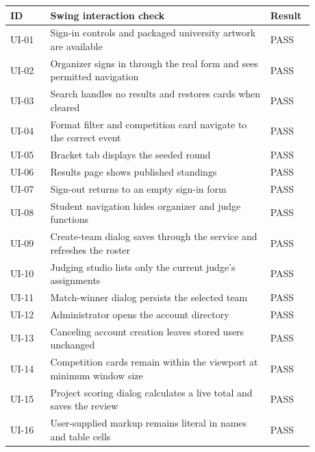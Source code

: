 \begingroup\renewcommand{\arraystretch}{1.05}\footnotesize\begin{longtable}{p{0.12\linewidth}p{0.66\linewidth}p{0.1\linewidth}}\toprule ID & Swing interaction check & Result\\\midrule\endhead
UI-01 & Sign-in controls and packaged university artwork are available & PASS\\
UI-02 & Organizer signs in through the real form and sees permitted navigation & PASS\\
UI-03 & Search handles no results and restores cards when cleared & PASS\\
UI-04 & Format filter and competition card navigate to the correct event & PASS\\
UI-05 & Bracket tab displays the seeded round & PASS\\
UI-06 & Results page shows published standings & PASS\\
UI-07 & Sign-out returns to an empty sign-in form & PASS\\
UI-08 & Student navigation hides organizer and judge functions & PASS\\
UI-09 & Create-team dialog saves through the service and refreshes the roster & PASS\\
UI-10 & Judging studio lists only the current judge's assignments & PASS\\
UI-11 & Match-winner dialog persists the selected team & PASS\\
UI-12 & Administrator opens the account directory & PASS\\
UI-13 & Canceling account creation leaves stored users unchanged & PASS\\
UI-14 & Competition cards remain within the viewport at minimum window size & PASS\\
UI-15 & Project scoring dialog calculates a live total and saves the review & PASS\\
UI-16 & User-supplied markup remains literal in names and table cells & PASS\\
\bottomrule\end{longtable}\endgroup
